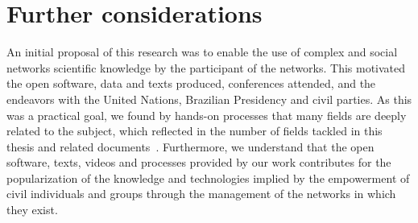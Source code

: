 \section{Further considerations}
An initial proposal of this research was to enable
the use of complex and social networks scientific knowledge by the participant of the networks.
This motivated the open software, data and texts produced, conferences attended, and the endeavors with
the United Nations, Brazilian Presidency and civil parties.
As this was a practical goal, we found by hands-on processes that
many fields are deeply related to the subject, which reflected in the number of fields tackled in this thesis
and related documents~\cite{pnud3,pnud4,opa,anPhy,antphy2,dialogaAlg,losd,versinus,kolmSmir}.
Furthermore, we understand that the open software, texts, videos and processes provided
by our work contributes for the popularization of the knowledge and technologies implied
by the empowerment of civil individuals and groups through the management of the
networks in which they exist.



